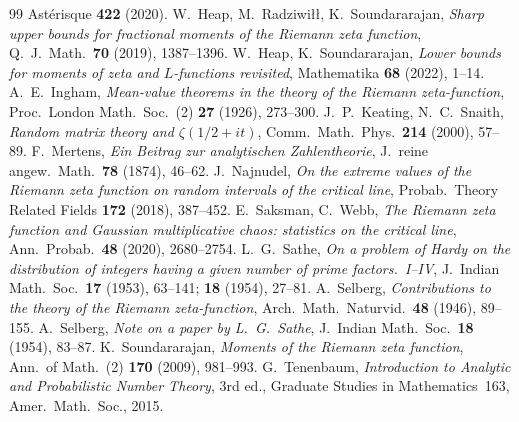 \documentclass[11pt]{amsart}
\theoremstyle{definition}
\begin{document}
\begin{thebibliography}{99}
Ast\'erisque \textbf{422} (2020).
 W.~Heap, M.~Radziwi{\l}{\l}, K.~Soundararajan, \emph{Sharp upper bounds for fractional moments of
the Riemann zeta function}, Q.\ J.\ Math.\ \textbf{70} (2019), 1387--1396.
 W.~Heap, K.~Soundararajan, \emph{Lower bounds for moments of zeta and $L$-functions revisited},
Mathematika \textbf{68} (2022), 1--14.
 A.~E.~Ingham, \emph{Mean-value theorems in the theory of the Riemann zeta-function},
Proc.\ London Math.\ Soc.\ (2) \textbf{27} (1926), 273--300.
 J.~P.~Keating, N.~C.~Snaith, \emph{Random matrix theory and $\zeta(1/2+it)$},
Comm.\ Math.\ Phys.\ \textbf{214} (2000), 57--89.
 F.~Mertens, \emph{Ein Beitrag zur analytischen Zahlentheorie},
J.\ reine angew.\ Math.\ \textbf{78} (1874), 46--62.
 J.~Najnudel, \emph{On the extreme values of the Riemann zeta function on random intervals of
the critical line}, Probab.\ Theory Related Fields \textbf{172} (2018), 387--452.
 E.~Saksman, C.~Webb, \emph{The Riemann zeta function and Gaussian multiplicative chaos:
statistics on the critical line}, Ann.\ Probab.\ \textbf{48} (2020), 2680--2754.
 L.~G.~Sathe, \emph{On a problem of Hardy on the distribution of integers having a given number
of prime factors.\ I--IV}, J.\ Indian Math.\ Soc.\ \textbf{17} (1953), 63--141; \textbf{18} (1954), 27--81.
 A.~Selberg, \emph{Contributions to the theory of the Riemann zeta-function},
Arch.\ Math.\ Naturvid.\ \textbf{48} (1946), 89--155.
 A.~Selberg, \emph{Note on a paper by L.~G.~Sathe},
J.\ Indian Math.\ Soc.\ \textbf{18} (1954), 83--87.
 K.~Soundararajan, \emph{Moments of the Riemann zeta function},
Ann.\ of Math.\ (2) \textbf{170} (2009), 981--993.
 G.~Tenenbaum, \emph{Introduction to Analytic and Probabilistic Number Theory},
3rd ed., Graduate Studies in Mathematics~163, Amer.\ Math.\ Soc., 2015.
\end{thebibliography}
\end{document}
